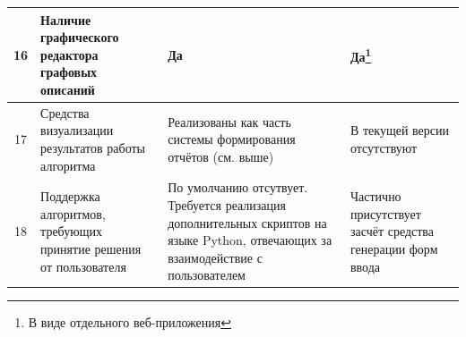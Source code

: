 \begin{landscape}
\begin{longtable}{|c|p{}|p{}|p{}|}
    \hline
    16         & Наличие графического редактора графовых описаний                                           & Да                                                                                                                                                                                                                                                                                                                                                                                                                                                                                                                                                                                                                                              & Да\footnote{В виде отдельного веб-приложения}                                                                                                                                                                                                                                     \\
    \hline
    17         & Средства визуализации результатов работы алгоритма                                         & Реализованы как часть системы формирования отчётов (см. выше)                                                                                                                                                                                                                                                                                                                                                                                                                                                                                                                                                                                   & В текущей версии отсутствуют                                                                                                                                                                                                                                                      \\
    \hline
    18         & Поддержка алгоритмов, требующих принятие решения от пользователя                           & По умолчанию отсутвует. Требуется реализация дополнительных скриптов на языке Python, отвечающих за взаимодействие с пользователем                                                                                                                                                                                                                                                                                                                                                                                                                                                                                                              & Частично присутствует засчёт средства генерации форм ввода\cite{SokolovPershin2017}                                                                                                                                                                                               \\

\end{longtable}
\end{landscape}
